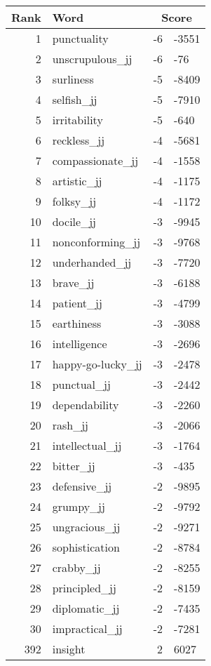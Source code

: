 \begin{longtable}[!htbp]{| rlr@{.}l |}
    \hline
    \textbf{Rank} & \textbf{Word} & \multicolumn{2}{c|}{\textbf{Score}} \\
    \hline
    \endhead
    1 & punctuality & -6 & -3551 \\
    2 & unscrupulous\_jj & -6 & -76 \\
    3 & surliness & -5 & -8409 \\
    4 & selfish\_jj & -5 & -7910 \\
    5 & irritability & -5 & -640 \\
    6 & reckless\_jj & -4 & -5681 \\
    7 & compassionate\_jj & -4 & -1558 \\
    8 & artistic\_jj & -4 & -1175 \\
    9 & folksy\_jj & -4 & -1172 \\
    10 & docile\_jj & -3 & -9945 \\
    11 & nonconforming\_jj & -3 & -9768 \\
    12 & underhanded\_jj & -3 & -7720 \\
    13 & brave\_jj & -3 & -6188 \\
    14 & patient\_jj & -3 & -4799 \\
    15 & earthiness & -3 & -3088 \\
    16 & intelligence & -3 & -2696 \\
    17 & happy-go-lucky\_jj & -3 & -2478 \\
    18 & punctual\_jj & -3 & -2442 \\
    19 & dependability & -3 & -2260 \\
    20 & rash\_jj & -3 & -2066 \\
    21 & intellectual\_jj & -3 & -1764 \\
    22 & bitter\_jj & -3 & -435 \\
    23 & defensive\_jj & -2 & -9895 \\
    24 & grumpy\_jj & -2 & -9792 \\
    25 & ungracious\_jj & -2 & -9271 \\
    26 & sophistication & -2 & -8784 \\
    27 & crabby\_jj & -2 & -8255 \\
    28 & principled\_jj & -2 & -8159 \\
    29 & diplomatic\_jj & -2 & -7435 \\
    30 & impractical\_jj & -2 & -7281 \\
    392 & insight & 2 & 6027 \\

\end{longtable}
